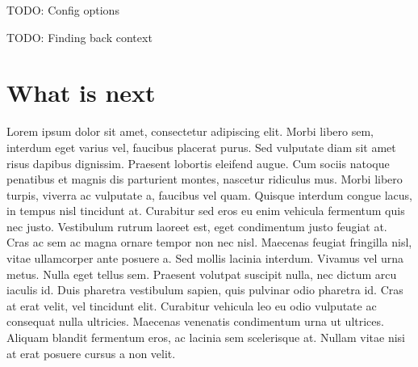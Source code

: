 TODO: Config options

TODO: Finding back context

\section{What is next}
Lorem ipsum dolor sit amet, consectetur adipiscing elit. Morbi libero sem,
interdum eget varius vel, faucibus placerat purus. Sed vulputate diam sit amet
risus dapibus dignissim. Praesent lobortis eleifend augue. Cum sociis natoque
penatibus et magnis dis parturient montes, nascetur ridiculus mus. Morbi libero
turpis, viverra ac vulputate a, faucibus vel quam. Quisque interdum congue
lacus, in tempus nisl tincidunt at. Curabitur sed eros eu enim vehicula
fermentum quis nec justo. Vestibulum rutrum laoreet est, eget condimentum justo
feugiat at. Cras ac sem ac magna ornare tempor non nec nisl. Maecenas feugiat
fringilla nisl, vitae ullamcorper ante posuere a. Sed mollis lacinia interdum.
Vivamus vel urna metus. Nulla eget tellus sem. Praesent volutpat suscipit nulla,
nec dictum arcu iaculis id. Duis pharetra vestibulum sapien, quis pulvinar odio
pharetra id. Cras at erat velit, vel tincidunt elit. Curabitur vehicula leo eu
odio vulputate ac consequat nulla ultricies. Maecenas venenatis condimentum
urna ut ultrices. Aliquam blandit fermentum eros, ac lacinia sem scelerisque
at. Nullam vitae nisi at erat posuere cursus a non velit.
